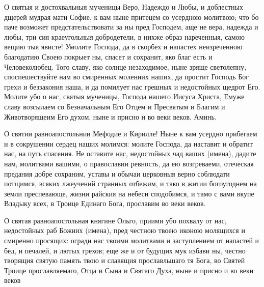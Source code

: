  


О святыя и достохвальныя мученицы Веро, Надеждо и Любы, и доблестных дщерей мудрая мати Софие, к вам ныне притецем со усердною молитвою; что бо паче возможет предстательствовати за ны пред Господем, аще не вера, надежда и любы, три сия краеугольныя добродетели, в нихже образ нареченныя, самою вещию тыя явисте! Умолите Господа, да в скорбех и напастех неизреченною благодатию Своею покрыет ны, спасет и сохранит, яко благ есть и Человеколюбец. Того славу, яко солнце незаходимое, ныне зряще светолепну, споспешествуйте нам во смиренных молениих наших, да простит Господь Бог грехи и беззакония наша, и да помилует нас грешных и недостойных щедрот Его. Молите убо о нас, святыя мученицы, Господа нашего Иисуса Христа, Емуже славу возсылаем со Безначальным Его Отцем и Пресвятым и Благим и Животворящеим Его духом, ныне и присно и во веки веков. Аминь.
\mychapterending

 


О святии равноапостольнии Мефодие и Кирилле! Ныне к вам усердно прибегаем и в сокрушении сердец наших молимся: молите Господа, да наставит и обратит нас, на путь спасения. Не оставите нас, недостойных чад ваших (имена), дадите нам, молитвами вашими, о православии ревность, да ею возгреваеми, отеческая предания добре сохраним, уставы и обычаи церковныя верно соблюдати  потщимся, всяких лжеучений странных отбежим, и тако в житии богоугоднем на земли преспевающе, жизни райския на небеси сподобимся, и тамо с вами вкупе Владыку всех, в Троице Единаго Бога, прославим во веки веков.
\mychapterending

 


О святая равноапостольная княгине Ольго, приими убо похвалу от нас, недостойных раб Божиих (имена), пред  честною твоею иконою молящихся и смиренно просящих: огради нас твоими молитвами и заступлением от напастей и бед,  и печалей, и лютых грехов; еще же и от будущих мук избави ны, честно творящия святую память твою и славящия прославльшаго тя Бога, во Святей Троице прославляемаго, Отца и Сына и Святаго Духа, ныне и присно и во веки веков
\mychapterending

